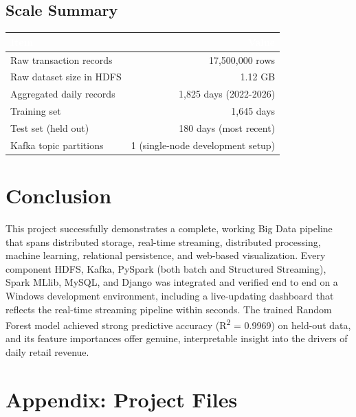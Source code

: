 \documentclass[11pt]{article}
\begin{document}
\subsection{Scale Summary}

\begin{table}[H]
\centering
\begin{tabularx}{0.85\textwidth}{@{}>{\raggedright\arraybackslash}Xr@{}}
\toprule
\rowcolor{navy}\textcolor{white}{\textbf{Item}} & \textcolor{white}{\textbf{Value}} \\
\midrule
Raw transaction records & 17,500,000 rows \\
\rowcolor{rowalt} Raw dataset size in HDFS & 1.12 GB \\
Aggregated daily records & 1,825 days (2022-2026) \\
\rowcolor{rowalt} Training set & 1,645 days \\
Test set (held out) & 180 days (most recent) \\
\rowcolor{rowalt} Kafka topic partitions & 1 (single-node development setup) \\
\bottomrule
\end{tabularx}
\end{table}
\renewcommand{\arraystretch}{1}

\section{Conclusion}

This project successfully demonstrates a complete, working Big Data pipeline that spans distributed storage, real-time streaming, distributed processing, machine learning, relational persistence, and web-based visualization. Every component HDFS, Kafka, PySpark (both batch and Structured Streaming), Spark MLlib, MySQL, and Django was integrated and verified end to end on a Windows development environment, including a live-updating dashboard that reflects the real-time streaming pipeline within seconds. The trained Random Forest model achieved strong predictive accuracy (R\textsuperscript{2} = 0.9969) on held-out data, and its feature importances offer genuine, interpretable insight into the drivers of daily retail revenue.

\section{Appendix: Project Files}
\end{document}
